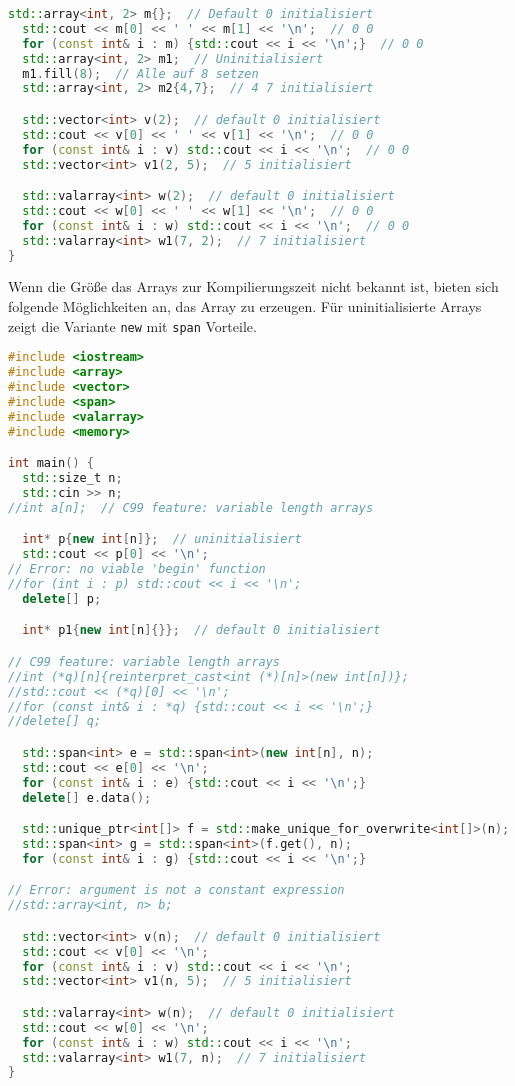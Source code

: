 \begin{lstlisting}[language=C++]
  std::array<int, 2> m{};  // Default 0 initialisiert
  std::cout << m[0] << ' ' << m[1] << '\n';  // 0 0
  for (const int& i : m) {std::cout << i << '\n';}  // 0 0
  std::array<int, 2> m1;  // Uninitialisiert
  m1.fill(8);  // Alle auf 8 setzen
  std::array<int, 2> m2{4,7};  // 4 7 initialisiert

  std::vector<int> v(2);  // default 0 initialisiert
  std::cout << v[0] << ' ' << v[1] << '\n';  // 0 0
  for (const int& i : v) std::cout << i << '\n';  // 0 0
  std::vector<int> v1(2, 5);  // 5 initialisiert

  std::valarray<int> w(2);  // default 0 initialisiert
  std::cout << w[0] << ' ' << w[1] << '\n';  // 0 0
  for (const int& i : w) std::cout << i << '\n';  // 0 0
  std::valarray<int> w1(7, 2);  // 7 initialisiert
}
\end{lstlisting}

Wenn die Größe das Arrays zur Kompilierungszeit nicht bekannt ist, bieten sich
folgende Möglichkeiten an, das Array zu erzeugen. Für uninitialisierte Arrays
zeigt die Variante \lstinline|new| mit \lstinline|span| Vorteile.

\begin{lstlisting}[language=C++]
#include <iostream>
#include <array>
#include <vector>
#include <span>
#include <valarray>
#include <memory>

int main() {
  std::size_t n;
  std::cin >> n;
//int a[n];  // C99 feature: variable length arrays

  int* p{new int[n]};  // uninitialisiert
  std::cout << p[0] << '\n';
// Error: no viable 'begin' function
//for (int i : p) std::cout << i << '\n';
  delete[] p;

  int* p1{new int[n]{}};  // default 0 initialisiert

// C99 feature: variable length arrays
//int (*q)[n]{reinterpret_cast<int (*)[n]>(new int[n])};
//std::cout << (*q)[0] << '\n';
//for (const int& i : *q) {std::cout << i << '\n';}
//delete[] q;

  std::span<int> e = std::span<int>(new int[n], n);
  std::cout << e[0] << '\n';
  for (const int& i : e) {std::cout << i << '\n';}
  delete[] e.data();

  std::unique_ptr<int[]> f = std::make_unique_for_overwrite<int[]>(n);
  std::span<int> g = std::span<int>(f.get(), n);
  for (const int& i : g) {std::cout << i << '\n';}

// Error: argument is not a constant expression
//std::array<int, n> b;

  std::vector<int> v(n);  // default 0 initialisiert
  std::cout << v[0] << '\n';
  for (const int& i : v) std::cout << i << '\n';
  std::vector<int> v1(n, 5);  // 5 initialisiert

  std::valarray<int> w(n);  // default 0 initialisiert
  std::cout << w[0] << '\n';
  for (const int& i : w) std::cout << i << '\n';
  std::valarray<int> w1(7, n);  // 7 initialisiert
}
\end{lstlisting}

